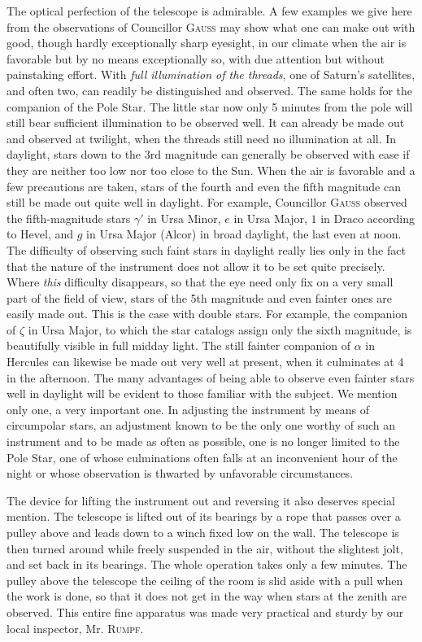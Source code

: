 The optical perfection of the telescope is admirable. A few examples we give here from the observations of Councillor \textsc{Gauss} may show what one can make out with good, though hardly exceptionally sharp eyesight, in our climate when the air is favorable but by no means exceptionally so, with due attention but without painstaking effort. With \emph{full illumination of the threads}, one of Saturn’s satellites, and often two, can readily be distinguished and observed. The same holds for the companion of the Pole Star. The little star now only 5 minutes from the pole will still bear sufficient illumination to be observed well. It can already be made out and observed at twilight, when the threads still need no illumination at all. In daylight, stars down to the 3rd magnitude can generally be observed with ease if they are neither too low nor too close to the Sun. When the air is favorable and a few precautions are taken, stars of the fourth and even the fifth magnitude can still be made out quite well in daylight. For example, Councillor \textsc{Gauss} observed the fifth-magnitude stars $\gamma'$ in Ursa Minor, $e$ in Ursa Major, $1$ in Draco according to Hevel, and $g$ in Ursa Major (Alcor) in broad daylight, the last even at noon. The difficulty of observing such faint stars in daylight really lies only in the fact that the nature of the instrument does not allow it to be set quite precisely. Where \emph{this} difficulty disappears, so that the eye need only fix on a very small part of the field of view, stars of the 5th magnitude and even fainter ones are easily made out. This is the case with double stars. For example, the companion of $\zeta$ in Ursa Major, to which the star catalogs assign only the sixth magnitude, is beautifully visible in full midday light. The still fainter companion of $\alpha$ in Hercules can likewise be made out very well at present, when it culminates at 4 in the afternoon. The many advantages of being able to observe even fainter stars well in daylight will be evident to those familiar with the subject. We mention only one, a very important one. In adjusting the instrument by means of circumpolar stars, an adjustment known to be the only one worthy of such an instrument and to be made as often as possible, one is no longer limited to the Pole Star, one of whose culminations often falls at an inconvenient hour of the night or whose observation is thwarted by unfavorable circumstances.

\par\indent The device for lifting the instrument out and reversing it also deserves special mention. The telescope is lifted out of its bearings by a rope that passes over a pulley above and leads down to a winch fixed low on the wall. The telescope is then turned around while freely suspended in the air, without the slightest jolt, and set back in its bearings. The whole operation takes only a few minutes. The pulley above the telescope the ceiling of the room is slid aside with a pull when the work is done, so that it does not get in the way when stars at the zenith are observed. This entire fine apparatus was made very practical and sturdy by our local inspector, Mr. \textsc{Rumpf}.

